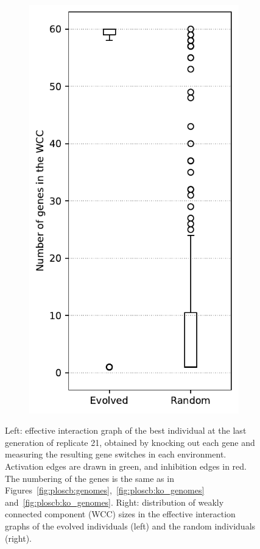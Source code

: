 \begin{figure}[H]
\begin{subfigure}[c]{0.29\textwidth}
    \includegraphics[width=\textwidth]{ploscb/img/effective_graph_wcc_distr.pdf}
  \end{subfigure}
  \caption[Effective interaction graph of an evolved individual, and distribution of effective interaction graph WCCs in evolved and random individuals]{Left: effective interaction graph of the best individual at the last generation of replicate 21, obtained by knocking out each gene and measuring the resulting gene switches in each environment.
  Activation edges are drawn in green, and inhibition edges in red.
  The numbering of the genes is the same as in Figures~\ref{fig:ploscb:genomes},~\ref{fig:ploscb:ko_genomes} and~\ref{fig:ploscb:ko_genomes}.
  Right: distribution of weakly connected component (WCC) sizes in the effective interaction graphs of the evolved individuals (left) and the random individuals (right).}
  \label{fig:ploscb:ko_graph}
\end{figure}

